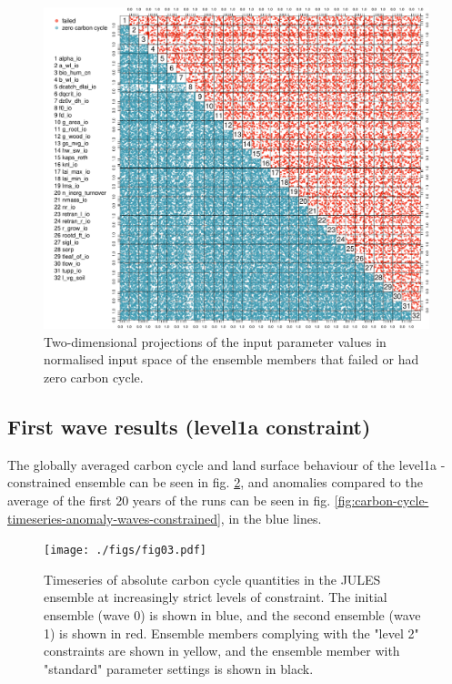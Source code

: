 \documentclass[gmd, manuscript]{copernicus}
\begin{document}


\begin{figure}[t]
\includegraphics[width=12cm]{./figs/fig02.pdf}
\caption{Two-dimensional projections of the input parameter values in normalised input space of the ensemble members that failed or had zero carbon cycle.}
\label{fig:run-failure-pairs}
\end{figure}


\subsection{First wave results (level1a constraint)}\label{sssec:level1a}

The globally averaged carbon cycle and land surface behaviour of the level1a - constrained ensemble can be seen in fig. \ref{fig:carbon-cycle-timeseries-waves-constrained}, and anomalies compared to the average of the first 20 years of the runs can be seen in fig. \ref{fig:carbon-cycle-timeseries-anomaly-waves-constrained}, in the blue lines.

\begin{figure}[t]
\texttt{[image: ./figs/fig03.pdf]}
\caption{Timeseries of absolute carbon cycle quantities in the JULES ensemble at increasingly strict levels of constraint. The initial ensemble (wave 0) is shown in blue, and the second ensemble (wave 1) is shown in red. Ensemble members complying with the "level 2" constraints are shown in yellow, and the ensemble member with "standard" parameter settings is shown in black.}
\label{fig:carbon-cycle-timeseries-waves-constrained}
\end{figure}
\end{document}
